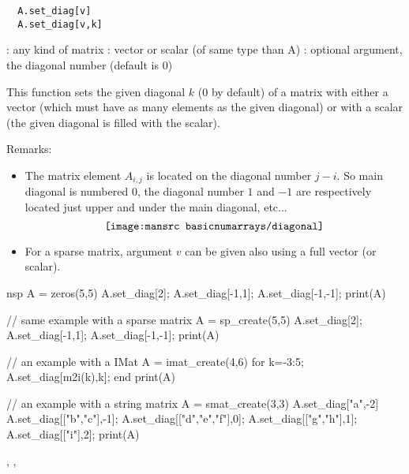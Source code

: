 \begin{mandesc}
\end{mandesc}
\begin{calling_sequence}
\begin{verbatim}
  A.set_diag[v]
  A.set_diag[v,k]
\end{verbatim}
\end{calling_sequence}
\begin{parameters}
  \begin{varlist}
    : any kind of matrix
    : vector or scalar (of same type than A)
    : optional argument, the diagonal number (default is $0$)
  \end{varlist}
\end{parameters}

\begin{mandescription}

  This function sets the given diagonal $k$ (0 by default) of a matrix 
with either a vector (which must have as many elements as the given 
diagonal) or with a scalar (the given diagonal is filled with the
scalar).

Remarks:  
\begin{itemize}
\item The matrix element $A_{i,j}$ is located on the diagonal number $j-i$. So main 
diagonal is numbered $0$, the diagonal number $1$ and $-1$ are respectively located just 
upper and under the main diagonal, etc...
  $$
  \texttt{[image: \\mansrc basicnumarrays/diagonal]} 
  $$

\item For a sparse matrix, argument $v$ can be given also using a full vector (or scalar).

\end{itemize}

\end{mandescription}

\begin{examples}
\begin{mintednsp}{nsp}
A = zeros(5,5)
A.set_diag[2]; A.set_diag[-1,1];  A.set_diag[-1,-1]; 
print(A)

// same example with a sparse matrix
A = sp_create(5,5)
A.set_diag[2]; A.set_diag[-1,1];  A.set_diag[-1,-1]; 
print(A)

// an example with a IMat
A = imat_create(4,6)
for k=-3:5; A.set_diag[m2i(k),k]; end
print(A)

// an example with a string matrix
A = smat_create(3,3)
A.set_diag["a",-2]
A.set_diag[["b","c"],-1]; 
A.set_diag[["d","e","f"],0]; 
A.set_diag[["g","h"],1]; 
A.set_diag[["i"],2]; 
print(A)
\end{mintednsp}
\end{examples}

\begin{manseealso}
  , , 
\end{manseealso}


